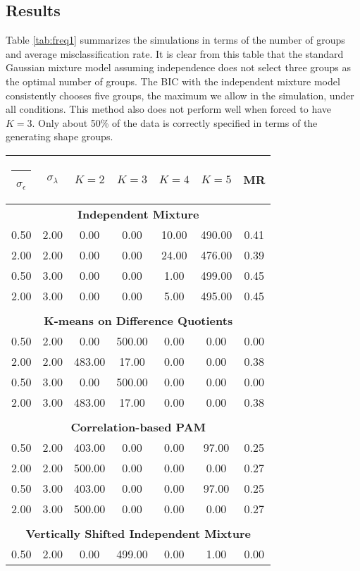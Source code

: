 \documentclass[12pt]{article}
\makeatletter
\newcommand{\thickhline}{%
    \noalign {\ifnum 0=`}\fi \hrule height 1.5pt
    \futurelet \reserved@a \@xhline
}
\makeatother
\begin{document}
\subsection{Results}
Table \ref{tab:freq1} summarizes the simulations in terms of the number of groups and average misclassification rate. It is clear from this table that the standard Gaussian mixture model assuming independence does not select three groups as the optimal number of groups. The BIC with the independent mixture model consistently chooses five groups, the maximum we allow in the simulation, under all conditions. This method also does not perform well when forced to have $K=3$. Only about 50\% of the data is correctly specified in terms of the generating shape groups.
\begin{table}[ht]
\begin{center}
\begin{tabular}{ccccccc}
  \thickhline $\sigma_{\epsilon}$&$\sigma_{\lambda}$&$K=2$&$K=3$&$K=4$&$K=5$&MR\\ \hline\multicolumn{7}{c}{\textbf{Independent Mixture}}\\ 0.50 & 2.00 & 0.00 & 0.00 & 10.00 & 490.00 & 0.41 \\ 
  2.00 & 2.00 & 0.00 & 0.00 & 24.00 & 476.00 & 0.39 \\ 
  0.50 & 3.00 & 0.00 & 0.00 & 1.00 & 499.00 & 0.45 \\ 
  2.00 & 3.00 & 0.00 & 0.00 & 5.00 & 495.00 & 0.45 \\ 
   \\ \multicolumn{7}{c}{\textbf{K-means on Difference Quotients}}\\0.50 & 2.00 & 0.00 & 500.00 & 0.00 & 0.00 & 0.00 \\ 
  2.00 & 2.00 & 483.00 & 17.00 & 0.00 & 0.00 & 0.38 \\ 
  0.50 & 3.00 & 0.00 & 500.00 & 0.00 & 0.00 & 0.00 \\ 
  2.00 & 3.00 & 483.00 & 17.00 & 0.00 & 0.00 & 0.38 \\ 
   \\ \multicolumn{7}{c}{\textbf{Correlation-based PAM}}\\0.50 & 2.00 & 403.00 & 0.00 & 0.00 & 97.00 & 0.25 \\ 
  2.00 & 2.00 & 500.00 & 0.00 & 0.00 & 0.00 & 0.27 \\ 
  0.50 & 3.00 & 403.00 & 0.00 & 0.00 & 97.00 & 0.25 \\ 
  2.00 & 3.00 & 500.00 & 0.00 & 0.00 & 0.00 & 0.27 \\ 
   \\ \multicolumn{7}{c}{\textbf{Vertically Shifted Independent Mixture}}\\0.50 & 2.00 & 0.00 & 499.00 & 0.00 & 1.00 & 0.00 \\ 

\end{tabular}
\end{center}
\end{table}
\end{document}
